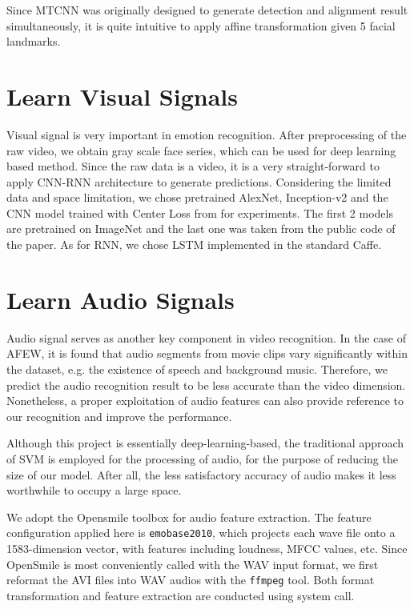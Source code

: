 \documentclass[10pt,twocolumn,letterpaper]{article}
\begin{document}
Since MTCNN was originally designed to generate detection and alignment result simultaneously, it is quite intuitive to apply affine transformation given 5 facial landmarks.


\section{Learn Visual Signals}

Visual signal is very important in emotion recognition. After preprocessing of the raw video, we obtain gray scale face series, which can be used for deep learning based method. Since the raw data is a video, it is a very straight-forward to apply CNN-RNN architecture to generate predictions. Considering the limited data and space limitation, we chose pretrained AlexNet, Inception-v2 and the CNN model trained with Center Loss from \cite{wen2016discriminative} for experiments. The first 2 models are pretrained on ImageNet and the last one was taken from the public code of the paper. As for RNN, we chose LSTM implemented in the standard Caffe.

\section{Learn Audio Signals}

Audio signal serves as another key component in video recognition. In the case of AFEW, it is found that audio segments from movie clips vary significantly within the dataset, e.g. the existence of speech and background music. Therefore, we predict the audio recognition result to be less accurate than the video dimension. Nonetheless, a proper exploitation of audio features can also provide reference to our recognition and improve the performance.

Although this project is essentially deep-learning-based, the traditional approach of SVM is employed for the processing of audio, for the purpose of reducing the size of our model. After all, the less satisfactory accuracy of audio makes it less worthwhile to occupy a large space.

We adopt the Opensmile toolbox \cite{eyben2010opensmile} for audio feature extraction. The feature configuration applied here is \texttt{emobase2010}, which projects each wave file onto a 1583-dimension vector, with features including loudness, MFCC values, etc. Since OpenSmile is most conveniently called with the WAV input format, we first reformat the AVI files into WAV audios with the \texttt{ffmpeg} tool. Both format transformation and feature extraction are conducted using system call. 
\end{document}
